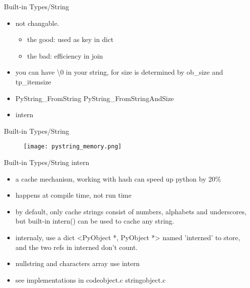 \documentclass[xcolor=svgnames]{beamer}
\begin{document}
\begin{frame}{Built-in Types/String}
\begin{itemize} 
  \item not changable.
      \begin{itemize}
        \item the good: used as key in dict
        \item the bad: efficiency in join
      \end{itemize}
  \item you can have \textbackslash0 in your string, for size is determined by ob\_size and tp\_itemsize
  \item PyString\_FromString PyString\_FromStringAndSize
  \item intern
    \end{itemize} 
\end{frame}

\begin{frame}[fragile]{Built-in Types/String}
    \begin{figure}
       \begin{center}
       \texttt{[image: pystring\_memory.png]}
       \end{center}
\end{figure}
\end{frame}

\begin{frame}{Built-in Types/String}
intern
\begin{itemize} 
        \item a cache mechanism, working with hash can speed up python by 20\%
        \item happens at compile time, not run time
        \item by default, only cache strings consist of numbers, alphabets and underscores, but built-in intern() can be used to cache any string.
        \item internaly, use a dict <PyObject *, PyObject *> named 'interned' to store, and the two refs in interned don't count.
        \item nullstring and characters array use intern
        \item see implementations in codeobject.c stringobject.c
\end{itemize} 
\end{frame}
\end{document}
